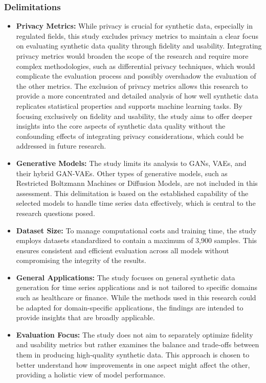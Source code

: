\documentclass{article}
\begin{document}
\subsubsection{Delimitations}
\begin{itemize}
    \item \textbf{Privacy Metrics:} While privacy is crucial for synthetic data, especially in regulated fields, this study excludes privacy metrics to maintain a clear focus on evaluating synthetic data quality through fidelity and usability. Integrating privacy metrics would broaden the scope of the research and require more complex methodologies, such as differential privacy techniques, which would complicate the evaluation process and possibly overshadow the evaluation of the other metrics. The exclusion of privacy metrics allows this research to provide a more concentrated and detailed analysis of how well synthetic data replicates statistical properties and supports machine learning tasks. By focusing exclusively on fidelity and usability, the study aims to offer deeper insights into the core aspects of synthetic data quality without the confounding effects of integrating privacy considerations, which could be addressed in future research.

    \item \textbf{Generative Models:} The study limits its analysis to GANs, VAEs, and their hybrid GAN-VAEs. Other types of generative models, such as Restricted Boltzmann Machines or Diffusion Models, are not included in this assessment. This delimitation is based on the established capability of the selected models to handle time series data effectively, which is central to the research questions posed.

    \item \textbf{Dataset Size:} To manage computational costs and training time, the study employs datasets standardized to contain a maximum of 3,900 samples. This ensures consistent and efficient evaluation across all models without compromising the integrity of the results.
    
    \item \textbf{General Applications:} The study focuses on general synthetic data generation for time series applications and is not tailored to specific domains such as healthcare or finance. While the methods used in this research could be adapted for domain-specific applications, the findings are intended to provide insights that are broadly applicable.

    \item \textbf{Evaluation Focus:} The study does not aim to separately optimize fidelity and usability metrics but rather examines the balance and trade-offs between them in producing high-quality synthetic data. This approach is chosen to better understand how improvements in one aspect might affect the other, providing a holistic view of model performance. 

\end{itemize}
\end{document}
